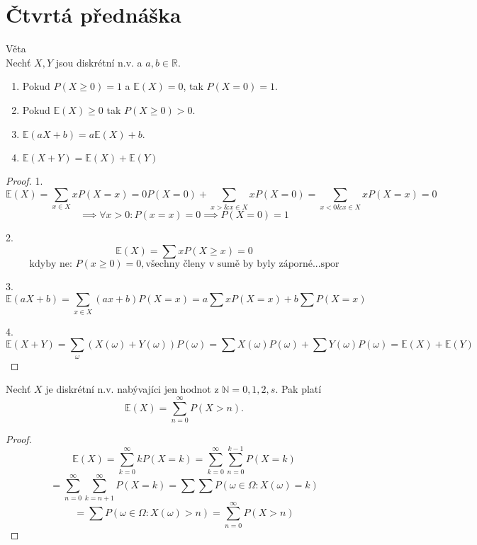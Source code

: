 \documentclass[../main.tex]{subfiles}
\begin{document}
\section{Čtvrtá přednáška}

\begin{theorem}
    Věta\\

    Nechť $X,Y$ jsou diskrétní n.v. a $a,b \in \mathbb{R}$.
    \begin{enumerate}
        \item Pokud $P(X\geq 0) = 1$ a $\mathbb{E}(X) = 0$, tak $P(X=0)=1$.
        \item Pokud $\mathbb{E}(X) \geq 0$ tak $P(X\geq 0) > 0.$
        \item $\mathbb{E}(a X + b) = a \mathbb{E}(X) + b$.
        \item $\mathbb{E}(X+Y) = \mathbb{E}(X) + \mathbb{E}(Y)$
    \end{enumerate}

    \begin{proof}
        1.\\
        \[\mathbb{E}(X) = \sum_{x \in X} x  P(X = x) = 0  P(X = 0) + \sum_{x > \& x \in X} x  P(X = 0) = 
        \sum_{x<0 \& x\in X} x P(X=x) = 0\]
        \[\implies \forall x > 0 : P(x = x) = 0 \implies P(X = 0) = 1\]

        2.\\
        \[\mathbb{E}(X) = \sum x P(X\geq x) = 0\]
        \[\text{kdyby ne: } P(x\geq 0) = 0, \text{všechny členy v sumě by byly záporné...spor}\]

        3.\\
        \[\mathbb{E}(a X+b) = \sum_{x\in X} (a x + b)P(X=x) = a\sum xP(X=x) + b\sum P(X=x)\]

        4.\\
        \[\mathbb{E}(X+Y) = \sum_{\omega}(X(\omega)+Y(\omega))P({\omega}) = \sum X(\omega)P({\omega})
        + \sum Y(\omega)P({\omega}) = \mathbb{E}(X) + \mathbb{E}(Y)\]
    \end{proof}
\end{theorem}

\begin{theorem}
    Nechť $X$ je diskrétní n.v. nabývajíci jen hodnot z $\mathbb{N} = {0,1,2,s}$. Pak platí
    \[\mathbb{E}(X) = \sum^\infty_{n = 0} P(X>n).\]
    \begin{proof}
        \[\mathbb{E}(X) = \sum^\infty_{k=0} kP(X=k) = \sum^\infty_{k=0} \sum^{k-1}_{n=0} P(X=k)\]
        \[= \sum_{n=0}^\infty \sum_{k=n+1}^\infty P(X=k) = \sum \sum P({\omega \in \Omega : X(\omega) = k})\]
        \[= \sum P({\omega \in \Omega : X(\omega) > n}) = \sum^\infty_{n=0} P(X>n)\]
    \end{proof}
\end{theorem}
\end{document}
